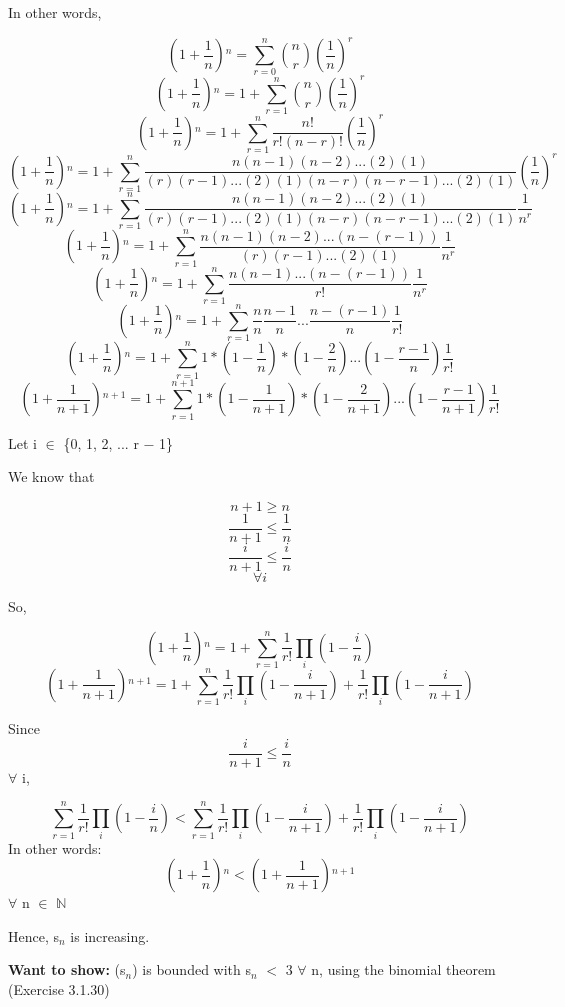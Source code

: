 \documentclass{article}
\newcommand{\mt}[1]{\ensuremath{#1}}
\newcommand{\wts}[1]{\textbf{Want to show: } #1}
\newcommand{\bn}{\mt{\mathbb{N}} }       %
\newcommand{\fa}{\mt{\forall} }          %
\newcommand{\mem}{\mt{\in} }
\newcommand{\prn}[1]{(#1)}
\newcommand{\bk}[1]{\{#1\}}
\newcommand{\ps}{\mt{+} }
\newcommand{\ms}{\mt{-} }
\newcommand{\ls}{\mt{<} }
\newcommand{\lse}{\mt{\leq} }
\newcommand{\gre}{\mt{\geq} }
\newcommand{\eql}{\mt{=} }
\newcommand{\uw}[2]{#1\mt{_{#2}}}
\newcommand{\uf}[2]{#1\mt{^{#2}}}
\newcommand{\frc}[2]{\mt{\frac{#1}{#2}}}
\newcommand{\nck}[2]{\mt{{#1 \choose #2}}}
\newcommand{\eqn}[1]{\[#1\]}
\begin{document}
{{In other words,

\eqn{\uf{\prn{1 \ps \frc{1}{n}}}{n} \eql \sum_{r = 0}^n \nck{n}{r}(\frac{1}{n})^r}
\eqn{\uf{\prn{1 \ps \frc{1}{n}}}{n} \eql 1 \ps \sum_{r = 1}^n \nck{n}{r}(\frac{1}{n})^r}
\eqn{\uf{\prn{1 \ps \frc{1}{n}}}{n} \eql 1 \ps \sum_{r = 1}^n \frac{n!}{r!(n-r)!} (\frac{1}{n})^r}
\eqn{\uf{\prn{1 \ps \frc{1}{n}}}{n} \eql 1 \ps \sum_{r = 1}^n \frac{n(n - 1)(n - 2)...(2)(1)}{(r)(r - 1)...(2)(1)(n-r)(n-r-1)...(2)(1)} (\frac{1}{n})^r}
\eqn{\uf{\prn{1 \ps \frc{1}{n}}}{n} \eql 1 \ps \sum_{r = 1}^n \frac{n(n - 1)(n - 2)...(2)(1)}{(r)(r - 1)...(2)(1)(n-r)(n-r-1)...(2)(1)} \frac{1}{n^r}}
\eqn{\uf{\prn{1 \ps \frc{1}{n}}}{n} \eql 1 \ps \sum_{r = 1}^n \frac{n(n - 1)(n - 2)...(n - (r - 1))}{(r)(r - 1)...(2)(1)} \frac{1}{n^r}}
\eqn{\uf{\prn{1 \ps \frc{1}{n}}}{n} \eql 1 \ps \sum_{r = 1}^n \frac{n(n - 1)...(n - (r - 1))}{r!} \frac{1}{n^r}}
\eqn{\uf{\prn{1 \ps \frc{1}{n}}}{n} \eql 1 \ps \sum_{r = 1}^n \frac{n}{n}\frac{n - 1}{n}...\frac{n - (r - 1)}{n}\frac{1}{r!}}
\eqn{\uf{\prn{1 \ps \frc{1}{n}}}{n} \eql 1 \ps \sum_{r = 1}^n 1 * ( 1 - \frac{1}{n}) * ( 1 - \frac{2}{n})...(1 - \frac{r - 1}{n})\frac{1}{r!}}
\eqn{\uf{\prn{1 \ps \frc{1}{n + 1}}}{n + 1} \eql 1 \ps \sum_{r = 1}^{n + 1} 1 * ( 1 - \frac{1}{n + 1}) * ( 1 - \frac{2}{n + 1})...(1 - \frac{r - 1}{n + 1})\frac{1}{r!}}

Let i \mem \bk{0, 1, 2, ... r \ms 1}

We know that

\eqn{n + 1 \gre n}
\eqn{\frac{1}{n + 1} \lse \frac{1}{n}}
\eqn{\frac{i}{n + 1} \lse \frac{i}{n}}
\eqn{\fa i}

So,

\eqn{\uf{\prn{1 \ps \frc{1}{n}}}{n} \eql 1 \ps \sum_{r = 1}^n \frac{1}{r!}\prod_i(1 - \frac{i}{n})}
\eqn{\uf{\prn{1 \ps \frc{1}{n + 1}}}{n + 1} \eql 1 \ps \sum_{r = 1}^{n} \frac{1}{r!}\prod_i(1 - \frac{i}{n + 1}) + \frac{1}{r!}\prod_i(1 - \frac{i}{n + 1})}

Since
\eqn{\frac{i}{n + 1} \lse \frac{i}{n}}
\fa i,

\eqn{\sum_{r = 1}^n \frac{1}{r!}\prod_i(1 - \frac{i}{n}) \ls \sum_{r = 1}^{n} \frac{1}{r!}\prod_i(1 - \frac{i}{n + 1}) + \frac{1}{r!}\prod_i(1 - \frac{i}{n + 1})}
In other words:
\eqn{\uf{\prn{1 \ps \frc{1}{n}}}{n} \ls \uf{\prn{1 \ps \frc{1}{n + 1}}}{n + 1}}
\fa n \mem \bn 

Hence, \uw{s}{n} is increasing.

\wts{\prn{\uw{s}{n}} is bounded with \uw{s}{n} \ls 3 \fa n, using the binomial theorem (Exercise 3.1.30)}

}}
\end{document}

